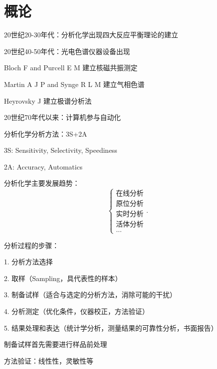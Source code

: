 \section{概论}%
\label{sec:概论}
20世纪20-30年代：分析化学出现四大反应平衡理论的建立

20世纪40-50年代：光电色谱仪器设备出现
\begin{notation}
    Bloch F and Purcell E M 建立核磁共振测定

    Martin A J P and Synge R L M 建立气相色谱

    Heyrovsky J 建立极谱分析法
\end{notation}
20世纪70年代以来：计算机参与自动化
\begin{notation}
    分析化学分析方法：3S+2A

    3S: Sensitivity, Selectivity, Speediness
    
    2A: Accuracy, Automatics
\end{notation}
分析化学主要发展趋势：
\[
    \begin{cases}
        \text{在线分析}\\ 
        \text{原位分析}\\ 
        \text{实时分析}\\ 
        \text{活体分析}\\ 
        \ldots
    \end{cases}
.\] 
\begin{notation}
    分析过程的步骤：

    1. 分析方法选择

    2. 取样（Sampling，具代表性的样本）

    3. 制备试样（适合与选定的分析方法，消除可能的干扰）

    4. 分析测定（优化条件，仪器校正，方法验证）

    5. 结果处理和表达（统计学分析，测量结果的可靠性分析，书面报告）
\end{notation}
\begin{notation}
    制备试样首先需要进行样品前处理

    方法验证：线性性，灵敏性等
\end{notation}
